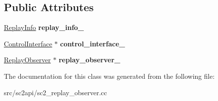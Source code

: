 \subsection*{Public Attributes}
\begin{DoxyCompactItemize}
\item 
\mbox{\label{classsc2_1_1_replay_control_imp_abebb5ddedd0a085bd70a20738aee1534}} 
\hyperlink{structsc2_1_1_replay_info}{Replay\+Info} {\bfseries replay\+\_\+info\+\_\+}
\item 
\mbox{\label{classsc2_1_1_replay_control_imp_af5142abbbf0efb91bd966e547f77e026}} 
\hyperlink{classsc2_1_1_control_interface}{Control\+Interface} $\ast$ {\bfseries control\+\_\+interface\+\_\+}
\item 
\mbox{\label{classsc2_1_1_replay_control_imp_ae688ae29e4daf4d0743902c155652d50}} 
\hyperlink{classsc2_1_1_replay_observer}{Replay\+Observer} $\ast$ {\bfseries replay\+\_\+observer\+\_\+}
\end{DoxyCompactItemize}


The documentation for this class was generated from the following file\+:\begin{DoxyCompactItemize}
\item 
src/sc2api/sc2\+\_\+replay\+\_\+observer.\+cc\end{DoxyCompactItemize}
